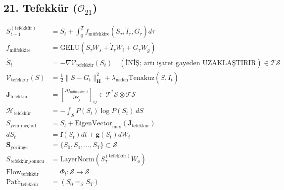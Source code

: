 \documentclass[11pt, a4paper]{article}
\begin{document}
\subsection{21. Tefekkür ($\mathcal{O}_{21}$)}
\begin{align}
S_{t+1}^{(\text{tefekkür})} &= S_t + \int_{0}^T f_{\text{müfekkire}}(S_\tau, \dot{I}_\tau, G_\tau) d\tau \\
f_{\text{müfekkire}} &= \text{GELU}(S_\tau W_s + \dot{I}_\tau W_i + G_\tau W_g) \\
\dot{S}_t &= -\nabla \mathcal{V}_{\text{tefekkür}}(S_t) \quad (\text{İNİŞ; artı işaret gayeden UZAKLAŞTIRIR}) \in \mathcal{T}\mathcal{S} \\
\mathcal{V}_{\text{tefekkür}}(S) &= \frac{1}{2} \|S - G_t\|_{\mathbf{H}}^2 + \lambda_{\text{neden}} \text{Tenakuz}(S, \dot{I}_t) \\
\mathbf{J}_{\text{tefekkür}} &= \left[ \frac{\partial f_{\text{müfekkire}, i}}{\partial S_j} \right]_{ij} \in \mathcal{T}^*\mathcal{S} \otimes \mathcal{T}\mathcal{S} \\
\mathcal{H}_{\text{tefekkür}} &= -\int_{\mathcal{S}} P(S_t) \log P(S_t) \, dS \\
S_{\text{yeni\_meçhul}} &= S_t + \text{EigenVector}_{\max}(\mathbf{J}_{\text{tefekkür}}) \\
d S_t &= \mathbf{f}(S_t) dt + \mathbf{g}(S_t) dW_t \\
\mathbf{S}_{\text{yörünge}} &= \{ S_0, S_1, \dots, S_T \} \subset \mathcal{S} \\
S_{\text{tefekkür\_sonucu}} &= \text{LayerNorm}(S_T^{(\text{tefekkür})} W_o) \\
\text{Flow}_{\text{tefekkür}} &= \Phi_t : \mathcal{S} \to \mathcal{S} \\
\text{Path}_{\text{tefekkür}} &= (S_0 =_{\mathcal{S}} S_T)
\end{align}
\end{document}
